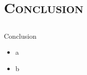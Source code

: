 	\section{\scshape Conclusion}
	\subsection{}
	\begin{frame}{Conclusion}
		\begin{itemize}
			\item a
			\item b
		\end{itemize}
	\end{frame}
	
	

